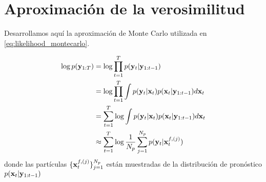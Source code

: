 \section{Aproximación de la verosimilitud}\label{appendix:likelihood_montecarlo}

Desarrollamos aquí la aproximación de Monte Carlo utilizada en \ref{eq:likelihood_montecarlo}.

\begin{align*}
    \log p(\mathbf{y}_{1:T}) &= \log \prod_{t=1}^{T} p(\mathbf{y}_t | \mathbf{y}_{1:t-1}) \\
    &= \log \prod_{t=1}^{T} \int p(\mathbf{y}_t | \mathbf{x}_t) p(\mathbf{x}_t | \mathbf{y}_{1:t-1}) d\mathbf{x}_t \\
    &= \sum_{t=1}^{T} \log \int p(\mathbf{y}_t | \mathbf{x}_t) p(\mathbf{x}_t | \mathbf{y}_{1:t-1}) d\mathbf{x}_t \\
    &\approx \sum_{t=1}^{T} \log \frac{1}{N_p} \sum_{j=1}^{N_p} p(\mathbf{y}_t | \mathbf{x}_t^{f, (j)})
\end{align*}
donde las partículas $\{\mathbf{x}_t^{f, (j)}\}_{j=1}^{N_p}$ están muestradas de la distribución de pronóstico $p(\mathbf{x}_t | \mathbf{y}_{1:t-1})$
